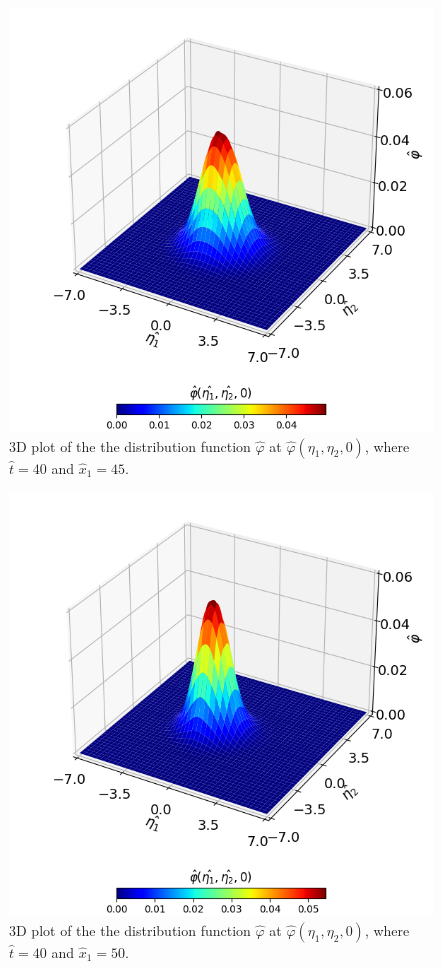 \documentclass[a4paper]{article}
\begin{document}
\begin{figure}[hbt!]
    \centering
    \includegraphics[width=14cm]{plots/problem_b_2.png}
    \caption{\centering 3D plot of the the distribution function $\hat{\varphi}$ at $\hat{\varphi}(\eta_1, \eta_2, 0)$, where $\hat{t} = 40$ and $\hat{x}_1 = 45$.}
    \label{problem_b_2}
\end{figure}
\clearpage
\begin{figure}[hbt!]
    \centering
    \includegraphics[width=14cm]{plots/problem_b_3.png}
    \caption{\centering  3D plot of the the distribution function $\hat{\varphi}$ at $\hat{\varphi}(\eta_1, \eta_2, 0)$, where $\hat{t} = 40$ and $\hat{x}_1 = 50$.}
    \label{problem_b_3}
\end{figure}
\end{document}
